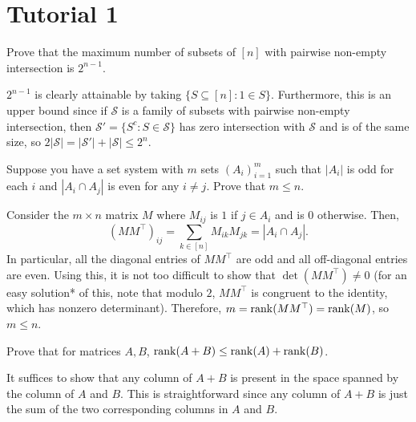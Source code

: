\documentclass{article}
\begin{document}
\thispagestyle{empty}
\titleBC

\tableofcontents

\vspace{1cm}

\clearpage

\section{Tutorial 1}

\begin{exercise}
	Prove that the maximum number of subsets of $[n]$ with pairwise non-empty intersection is $2^{n-1}$.
\end{exercise}
\begin{solution*}
	$2^{n-1}$ is clearly attainable by taking $\{S \subseteq [n] : 1 \in S\}$. Furthermore, this is an upper bound since if $\mathcal{S}$ is a family of subsets with pairwise non-empty intersection, then $\mathcal{S}' = \{S^c : S \in \mathcal{S}\}$ has zero intersection with $\mathcal{S}$ and is of the same size, so $2|\mathcal{S}| = |\mathcal{S}'|+|\mathcal{S}| \le 2^n$.
\end{solution*}

\begin{exercise}
	\label{ex1.2}
	Suppose you have a set system with $m$ sets $(A_i)_{i=1}^m$ such that $|A_i|$ is odd for each $i$ and $|A_i \cap A_j|$ is even for any $i \ne j$. Prove that $m \le n$.
\end{exercise}
\begin{solution*}
	Consider the $m \times n$ matrix $M$ where $M_{ij}$ is $1$ if $j \in A_i$ and is $0$ otherwise. Then,
	\[ (MM^\top)_{ij} = \sum_{k \in [n]} M_{ik} M_{jk} = |A_i \cap A_j|. \]
	In particular, all the diagonal entries of $MM^\top$ are odd and all off-diagonal entries are even. Using this, it is not too difficult to show that $\det(MM^\top) \ne 0$ (for an easy solution* of this, note that modulo $2$, $MM^\top$ is congruent to the identity, which has nonzero determinant). Therefore, $m = \operatorname{rank}(MM^\top) = \operatorname{rank}(M)$, so $m \le n$.
\end{solution*}

\begin{exercise}
	\label{ex1.3}
	Prove that for matrices $A,B$, $\operatorname{rank}(A+B) \le \operatorname{rank}(A)+\operatorname{rank}(B)$.
\end{exercise}
\begin{solution*}
	It suffices to show that any column of $A+B$ is present in the space spanned by the column of $A$ and $B$. This is straightforward since any column of $A+B$ is just the sum of the two corresponding columns in $A$ and $B$.
\end{solution*}
\end{document}

